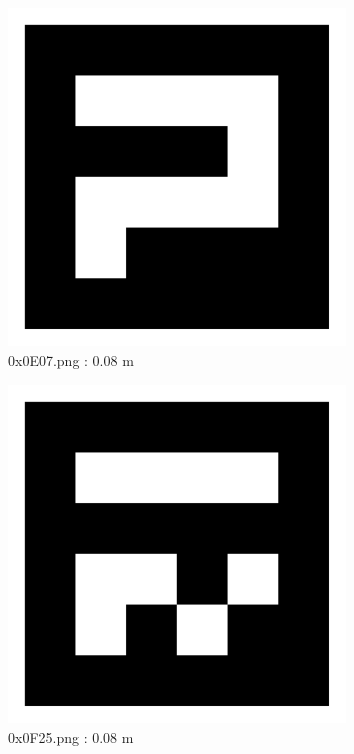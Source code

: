 \documentclass[11pt,a4,BCOR=0cm]{scrartcl}
\begin{document}
\begin{figure}
  \centering
    \includegraphics[width=8.955cm]{0x0E07.pdf}
    \caption{0x0E07.png : 0.08 m}
    \label{fig:0x0E07.pdf}
  
\end{figure} 

\begin{figure}
  \centering
    \includegraphics[width=8.955cm]{0x0F25.pdf}
    \caption{0x0F25.png : 0.08 m}
    \label{fig:0x0F25.pdf}
  
\end{figure} 

\clearpage
\end{document}
